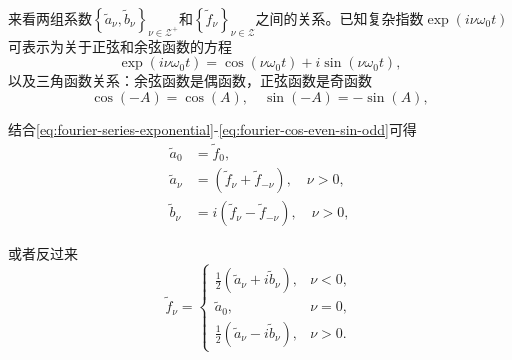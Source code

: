 来看两组系数$\left\{ \tilde{a}_{\nu}, \tilde{b}_{\nu} \right\}_{\nu \in \mathcal{Z}^{+}}$和$\left\{ \tilde{f}_{\nu} \right\}_{\nu \in \mathcal{Z}}$之间的关系。已知复杂指数$\exp \left( i \nu \omega_{0} t \right)$可表示为关于正弦和余弦函数的方程
\begin{equation}
  \label{eq:fourier-series-complex-expo}
  \exp \left( i \nu \omega_{0} t \right) = \cos \left( \nu \omega_{0} t \right) + i \sin \left( \nu \omega_{0} t \right),
\end{equation}
以及三角函数关系：余弦函数是偶函数，正弦函数是奇函数
\begin{equation}
  \label{eq:fourier-cos-even-sin-odd}
  \cos \left( - A \right) = \cos \left( A \right), \quad \sin \left( - A \right) = - \sin \left( A \right),
\end{equation}

结合\eqref{eq:fourier-series-exponential}-\eqref{eq:fourier-cos-even-sin-odd}可得
\begin{equation}
  \label{eq:fourier-series-representation-relation-coef}
  \begin{split}
    \tilde{a}_{0} & = \tilde{f}_{0}, \\
    \tilde{a}_{\nu} & = \left( \tilde{f}_{\nu} + \tilde{f}_{- \nu} \right), \quad \nu > 0, \\
    \tilde{b}_{\nu} & = i \left( \tilde{f}_{\nu} - \tilde{f}_{- \nu} \right), \quad \nu > 0,
  \end{split}
\end{equation}

或者反过来
\begin{equation}
  \label{eq:fourier-series-representation-relation-coeff}
  \tilde{f}_{\nu} =
  \begin{cases}
  \frac{1}{2} \left( \tilde{a}_{\nu} + i \tilde{b}_{\nu} \right), & \nu < 0, \\
  \tilde{a}_{0}, & \nu = 0, \\
  \frac{1}{2} \left( \tilde{a}_{\nu} - i \tilde{b}_{\nu} \right), & \nu > 0.
  \end{cases}
\end{equation}

